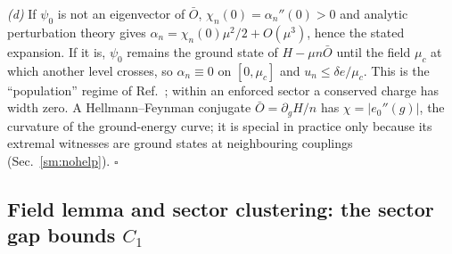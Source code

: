 \documentclass[aps,prx,onecolumn,10pt,nofootinbib,longbibliography,floatfix]{revtex4-2}
\theoremstyle{remark}
\newcommand{\de}{\delta e}
\begin{document}
\emph{(d)} If $\psi_0$ is not an eigenvector of $\bar O$, $\chi_n(0)=\alpha_n''(0)>0$ and analytic perturbation theory %
gives $\alpha_n=\chi_n(0)\mu^2/2+O(\mu^3)$, hence the stated expansion. If it is, $\psi_0$ remains the ground state of %
$H-\mu n\bar O$ until the field $\mu_c$ at which another level crosses, so $\alpha_n\equiv0$ on $[0,\mu_c]$ and %
$u_n\le\de/\mu_c$. This is the ``population'' regime of Ref.~\cite{manchanda2026}; within an enforced sector a %
conserved charge has width zero. A Hellmann--Feynman conjugate $\bar O=\partial_gH/n$ has $\chi=|e_0''(g)|$, the %
curvature of the ground-energy curve; it is special in practice only because its extremal witnesses are ground states
at neighbouring couplings (Sec.~\ref{sm:nohelp}). \hfill$\square$

\subsection{Field lemma and sector clustering: the sector gap bounds $C_1$}
\label{sm:field}
\end{document}
